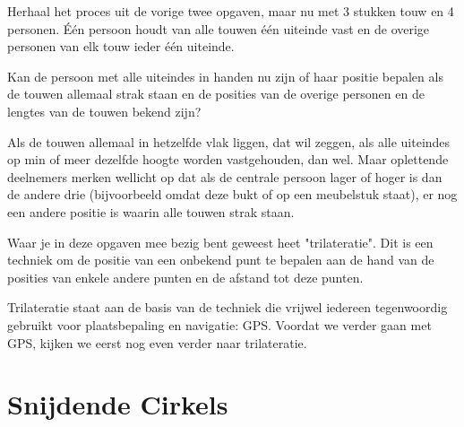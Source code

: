 \begin{opgave}
	Herhaal het proces uit de vorige twee opgaven, maar nu met 3 stukken touw en 4 personen. \'E\'en persoon houdt van alle touwen \'e\'en uiteinde vast en de overige personen van elk touw ieder \'e\'en uiteinde.

	Kan de persoon met alle uiteindes in handen nu zijn of haar positie bepalen als de touwen allemaal strak staan en de posities 	van de overige personen en de lengtes van de touwen bekend zijn?
	\begin{antwoord}
		Als de touwen allemaal in hetzelfde vlak liggen, dat wil zeggen, als alle uiteindes op min of meer dezelfde hoogte worden 	vastgehouden, dan wel. Maar oplettende deelnemers merken wellicht op dat als de centrale persoon lager of hoger is dan de 			andere drie (bijvoorbeeld omdat deze bukt of op een meubelstuk staat), er nog een andere positie is waarin alle touwen 				strak staan.
	\end{antwoord}
\end{opgave}

Waar je in deze opgaven mee bezig bent geweest heet "trilateratie". Dit is een techniek om de positie van een onbekend punt te bepalen aan de hand van de posities van enkele andere punten en de afstand tot deze punten.

Trilateratie staat aan de basis van de techniek die vrijwel iedereen tegenwoordig gebruikt voor plaatsbepaling en navigatie: GPS. Voordat we verder gaan met GPS, kijken we eerst nog even verder naar trilateratie.

\section{Snijdende Cirkels}

